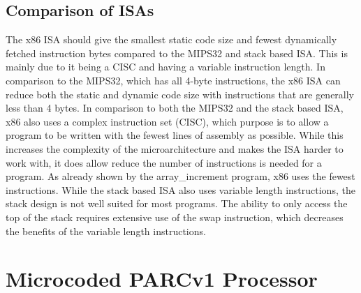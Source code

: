 \documentclass[10pt]{article}
\begin{document}
\subsection{Comparison of ISAs}
The x86 ISA should give the smallest static code size and fewest dynamically fetched instruction bytes compared to the MIPS32 and stack based ISA. This is mainly due to it being a CISC and having a variable instruction length. In comparison to the MIPS32, which has all 4-byte instructions, the x86 ISA can reduce both the static and dynamic code size with instructions that are generally less than 4 bytes. In comparison to both the MIPS32 and the stack based ISA, x86 also uses a complex instruction set (CISC), which purpose is to allow a program to be written with the fewest lines of assembly as possible. While this increases the complexity of the microarchitecture and makes the ISA harder to work with, it does allow reduce the number of instructions is needed for a program. As already shown by the array\_increment program, x86 uses the fewest instructions. While the stack based ISA also uses variable length instructions, the stack design is not well suited for most programs. The ability to only access the top of the stack requires extensive use of the swap instruction, which decreases the benefits of the variable length instructions. 

\cleardoublepage
\section{Microcoded PARCv1 Processor}
\end{document}
